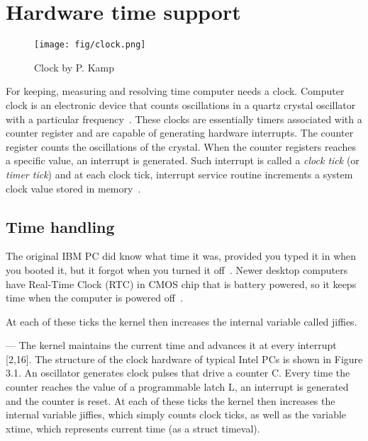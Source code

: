 
\chapter{Hardware time support}
\begin{figure}
	\centering
	\texttt{[image: fig/clock.png]}
	\caption{Clock by P. Kamp}
	\label{fig:hw-clock}
\end{figure}
For keeping, measuring and resolving time computer needs a clock.
Computer clock is an electronic device that counts oscillations in a
quartz crystal oscillator with a particular frequency~\cite{thesis-sync}.
These clocks are essentially timers associated with a counter register and
are capable of generating hardware interrupts.
The counter register counts the oscillations of the crystal.
When the counter registers reaches a specific value,
an interrupt is generated.
Such interrupt is called a {\it{clock tick}} (or {\it{timer tick}}) and at each clock tick,
interrupt service routine increments a system clock value stored in memory~\cite{thesis-sync}.

\section{Time handling}
The original IBM PC did know what time it was, provided you typed it in when you booted it,
but it forgot when you turned it off~\cite{timecounters}.
Newer desktop computers %
have Real-Time Clock (RTC) in CMOS chip that is battery powered,
so it keeps time when the computer is powered off~\cite{timecounters}.


At each of these ticks the kernel then increases the internal variable called jiffies.

---
The kernel maintains the current time and advances it at every interrupt [2,16].
The structure of the clock hardware of typical Intel PCs is shown in Figure 3.1.
An oscillator generates clock pulses that drive a counter C.
Every time the counter reaches the value of a programmable latch L,
an interrupt is generated and the counter is reset.
At each of these ticks the kernel then increases the internal variable jiffies,
which simply counts clock ticks, as well as the variable xtime,
which represents current time (as a struct timeval).

